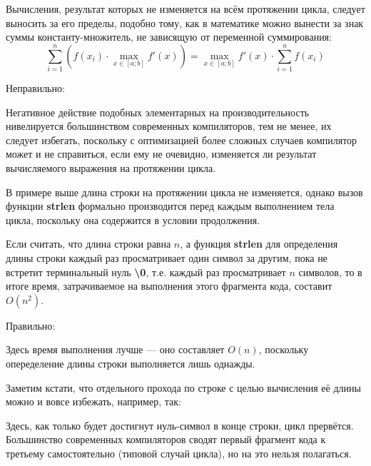 \begin{typerror}
	\label{TE_duplicate-calculations-for}
	
	Вычисления, результат которых не изменяется на всём протяжении цикла, следует выносить за его пределы,
	подобно тому, как в математике можно вынести за знак суммы константу-множитель, не зависящую от переменной суммирования:
	$$
		\sum_{i=1}^{n}\left(f(x_i)\cdot\max\limits_{x\in[a;b]}f'(x)\right) = \max\limits_{x\in[a;b]}f'(x)\cdot\sum_{i=1}^{n}f(x_i)
	$$


	Неправильно:

	Негативное действие подобных элементарных на производительность нивелируется большинством современных компиляторов,
	тем не менее, их следует избегать, поскольку с оптимизацией более сложных случаев компилятор может и не справиться,
	если ему не очевидно, изменяется ли результат вычисляемого выражения на протяжении цикла.

	В примере выше длина строки на протяжении цикла не изменяется,
	однако вызов функции \textbf{strlen} формально производится перед каждым выполнением тела цикла,
	поскольку она содержится в условии продолжения.

	Если считать, что длина строки равна $n$,
	а функция \textbf{strlen} для определения длины строки каждый раз просматривает один символ за другим,
	пока не встретит терминальный нуль \textbf{\textbackslash0}, т.е. каждый раз просматривает $n$ символов,
	то в итоге время, затрачиваемое на выполнения этого фрагмента кода, составит $O(n^2)$.

	Правильно:

	Здесь время выполнения лучше --- оно составляет $O(n)$, поскольку опеределение длины строки выполняется лишь однажды.
	
	Заметим кстати, что отдельного прохода по строке с целью вычисления её длины можно и вовсе избежать, например, так:

	Здесь, как только будет достигнут нуль-символ в конце строки, цикл прервётся.
	Большинство современных компиляторов сводят первый фрагмент кода к третьему самостоятельно (типовой случай цикла),
	но на это нельзя полагаться.

\end{typerror}
